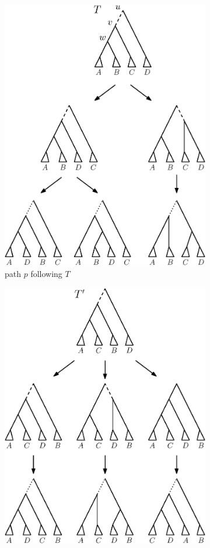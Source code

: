 \documentclass{amsart}
\begin{document}
\begin{enumerate}
\begin{figure}[H]
	\begin{subfigure}[b]{.45\textwidth}
		\centering
		\includegraphics[width=0.9\linewidth]{thm_fp_nni2a.eps}
		\vspace{12pt}
		\caption{path $p$ following $T$}
		\label{fig:thm_fp_nni2a}
	\end{subfigure}
	\begin{subfigure}[b]{.45\textwidth}
		\centering
		\includegraphics[width=0.9\linewidth]{thm_fp_nni2b.eps}

\end{subfigure}
\end{figure}
\end{enumerate}
\end{document}
